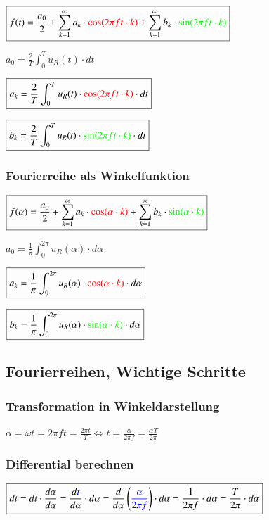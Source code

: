 $\boxed{
    f(t) = \frac{a_0}{2} + \sum_{k=1}^{\infty} a_k \cdot \textcolor{red}{\cos(2\pi f t \cdot k)} + \sum_{k=1}^{\infty} b_k \cdot \textcolor{green}{\sin(2\pi f t \cdot k)}
}$

$\boxed{
    a_0 = \frac{2}{T} \int_{0}^{T} u_R(t) \cdot dt
}$

$\boxed{
    a_k = \frac{2}{T} \int_{0}^{T} u_R(t) \cdot \textcolor{red}{\cos ( 2\pi f t \cdot k )} \cdot dt
}$

$\boxed{
    b_k = \frac{2}{T} \int_{0}^{T} u_R(t) \cdot \textcolor{green}{\sin ( 2\pi f t \cdot k )} \cdot dt
}$\\


\subsubsection{Fourierreihe als Winkelfunktion}

$\boxed{
    f(\alpha) = \frac{a_0}{2} + \sum_{k=1}^{\infty} a_k \cdot \textcolor{red}{\cos(\alpha \cdot k)} + \sum_{k=1}^{\infty} b_k \cdot \textcolor{green}{\sin(\alpha \cdot k)}
}$

$\boxed{
    a_0 = \frac{1}{\pi} \int_{0}^{2\pi} u_R(\alpha) \cdot d\alpha
}$

$\boxed{
    a_k = \frac{1}{\pi} \int_{0}^{2\pi} u_R(\alpha) \cdot \textcolor{red}{\cos ( \alpha \cdot k )} \cdot d\alpha
}$

$\boxed{
    b_k = \frac{1}{\pi} \int_{0}^{2\pi} u_R(\alpha) \cdot \textcolor{green}{\sin ( \alpha \cdot k )} \cdot d\alpha
}$\\


\subsection{Fourierreihen, Wichtige Schritte}

\subsubsection{Transformation in Winkeldarstellung}

$\boxed{\alpha = \omega t = 2\pi f t = \frac{2\pi t}{T}} \Leftrightarrow \boxed{t = \frac{\alpha}{2\pi f} = \frac{\alpha T}{2\pi}}$


\subsubsection{Differential berechnen}
$\boxed{dt = dt \cdot \frac{d\alpha}{d\alpha} 
= \frac{d\textcolor{blue}{t}}{d\alpha} \cdot d\alpha 
= \frac{d}{d\alpha} \left( \textcolor{blue}{\frac{\alpha}{2\pi f}} \right) \cdot d\alpha 
= \frac{1}{2\pi f} \cdot d\alpha 
= \frac{T}{2\pi} \cdot d\alpha}$\\

